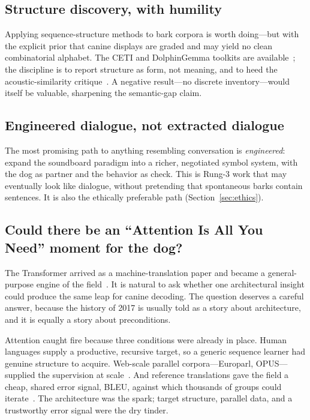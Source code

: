 \subsection{Structure discovery, with humility}
Applying sequence-structure methods to bark corpora is worth doing---but
with the explicit prior that canine displays are graded and may yield no
clean combinatorial alphabet. The CETI and DolphinGemma toolkits are
available~\cite{sharma2024whale,google2025dolphingemma}; the discipline is to
report structure as form, not meaning, and to heed the acoustic-similarity
critique~\cite{yovel2025critique}. A negative result---no discrete
inventory---would itself be valuable, sharpening the semantic-gap claim.

\subsection{Engineered dialogue, not extracted dialogue}
The most promising path to anything resembling conversation is
\emph{engineered}: expand the soundboard paradigm into a richer, negotiated
symbol system, with the dog as partner and the behavior as check. This is
Rung-3 work that may eventually look like dialogue, without pretending that
spontaneous barks contain sentences. It is also the ethically preferable
path (Section~\ref{sec:ethics}).

\subsection{Could there be an ``Attention Is All You Need'' moment for the dog?}
The Transformer arrived as a machine-translation paper and became a
general-purpose engine of the field~\cite{vaswani2017attention}. It is
natural to ask whether one architectural insight could produce the same
leap for canine decoding. The question deserves a careful answer, because
the history of 2017 is usually told as a story about architecture, and it
is equally a story about preconditions.

Attention caught fire because three conditions were already in place.
Human languages supply a productive, recursive target, so a generic
sequence learner had genuine structure to acquire. Web-scale parallel
corpora---Europarl, OPUS---supplied the supervision at
scale~\cite{koehn2004europarl,tiedemann2012opus}. And reference translations
gave the field a cheap, shared error signal, BLEU, against which thousands
of groups could iterate~\cite{papineni2002bleu}. The architecture was the
spark; target structure, parallel data, and a trustworthy error signal
were the dry tinder.

